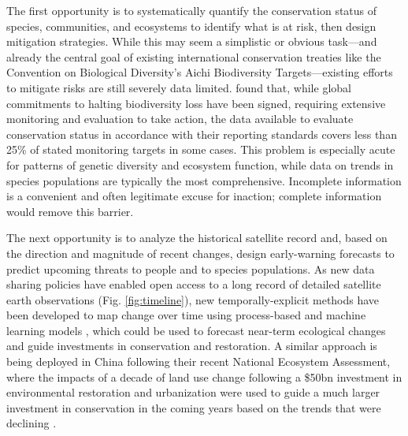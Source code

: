 The first opportunity is to systematically quantify the conservation status of species, communities, and ecosystems to identify what is at risk, then design mitigation strategies. While this may seem a simplistic or obvious task—and already the central goal of existing international conservation treaties like the Convention on Biological Diversity's Aichi Biodiversity Targets—existing efforts to mitigate risks are still severely data limited. \cite{Geijzendorffer2016-xv} found that, while global commitments to halting biodiversity loss have been signed, requiring extensive monitoring and evaluation to take action, the data available to evaluate conservation status in accordance with their reporting standards covers less than 25\% of stated monitoring targets in some cases. This problem is especially acute for patterns of genetic diversity and ecosystem function, while data on trends in species populations are typically the most comprehensive. Incomplete information is a convenient and often legitimate excuse for inaction; complete information would remove this barrier.

The next opportunity is to analyze the historical satellite record and, based on the direction and magnitude of recent changes, design early-warning forecasts to predict upcoming threats to people and to species populations. As new data sharing policies have enabled open access to a long record of detailed satellite earth observations (Fig. \ref{fig:timeline}), new temporally-explicit methods have been developed to map change over time using process-based and machine learning models \cite{Cohen2018-xk, Rao2020-qk}, which could be used to forecast near-term ecological changes and guide investments in conservation and restoration. A similar approach is being deployed in China following their recent National Ecosystem Assessment, where the impacts of a decade of land use change following a \$50bn investment in environmental restoration and urbanization were used to guide a much larger investment in conservation in the coming years based on the trends that were declining \cite{Ouyang2016-il, Bryan2018-xz}.

